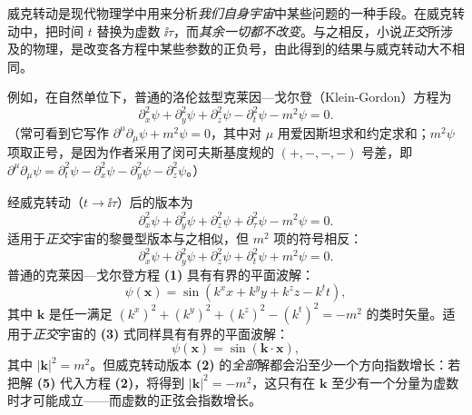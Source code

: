 \begin{description}[style=nextline, leftmargin=0em, itemsep=0.8ex]
\item[威克转动（Wick rotation）]
威克转动是现代物理学中用来分析\emph{我们自身宇宙}中某些问题的一种手段。在威克转动中，把时间 $t$ 替换为虚数 $\ii\tau$，而\emph{其余一切都不改变}。与之相反，小说\emph{正交}所涉及的物理，是改变各方程中某些参数的正负号，由此得到的结果与威克转动大不相同。

例如，在自然单位下，普通的洛伦兹型克莱因—戈尔登（Klein-Gordon）方程为
\begin{equation}
\partial_{x}^{2}\psi+\partial_{y}^{2}\psi+\partial_{z}^{2}\psi-\partial_{t}^{2}\psi-m^{2}\psi=0 . \tag{1}
\end{equation}
（常可看到它写作 $\partial^{\mu}\partial_{\mu}\psi+m^{2}\psi=0$，其中对 $\mu$ 用爱因斯坦求和约定求和；$m^{2}\psi$ 项取正号，是因为作者采用了闵可夫斯基度规的 $(+,-,-,-)$ 号差，即 $\partial^{\mu}\partial_{\mu}\psi=\partial_{t}^{2}\psi-\partial_{x}^{2}\psi-\partial_{y}^{2}\psi-\partial_{z}^{2}\psi$。）

经威克转动（$t\to\ii\tau$）后的版本为
\begin{equation}
\partial_{x}^{2}\psi+\partial_{y}^{2}\psi+\partial_{z}^{2}\psi+\partial_{\tau}^{2}\psi-m^{2}\psi=0 . \tag{2}
\end{equation}
适用于\emph{正交}宇宙的黎曼型版本与之相似，但 $m^{2}$ 项的符号相反：
\begin{equation}
\partial_{x}^{2}\psi+\partial_{y}^{2}\psi+\partial_{z}^{2}\psi+\partial_{t}^{2}\psi+m^{2}\psi=0 . \tag{3}
\end{equation}
普通的克莱因—戈尔登方程 \textbf{(1)} 具有有界的平面波解：
\begin{equation}
\psi(\mathbf{x})=\sin(k^{x}x+k^{y}y+k^{z}z-k^{t}t), \tag{4}
\end{equation}
其中 $\mathbf{k}$ 是任一满足 $(k^{x})^{2}+(k^{y})^{2}+(k^{z})^{2}-(k^{t})^{2}=-m^{2}$ 的类时矢量。适用于\emph{正交}宇宙的 \textbf{(3)} 式同样具有有界的平面波解：
\begin{equation}
\psi(\mathbf{x})=\sin(\mathbf{k}\cdot\mathbf{x}), \tag{5}
\end{equation}
其中 $|\mathbf{k}|^{2}=m^{2}$。但威克转动版本 \textbf{(2)} 的\emph{全部}解都会沿至少一个方向指数增长：若把解 \textbf{(5)} 代入方程 \textbf{(2)}，将得到 $|\mathbf{k}|^{2}=-m^{2}$，这只有在 $\mathbf{k}$ 至少有一个分量为虚数时才可能成立——而虚数的正弦会指数增长。

\end{description}
